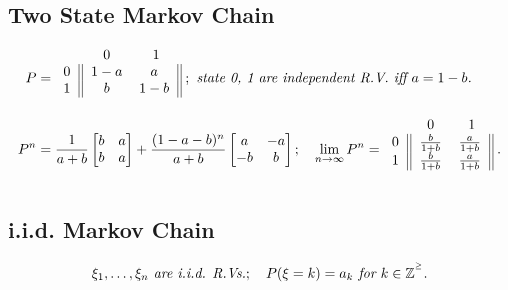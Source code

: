\documentclass{article}
\begin{document}
\subsection{Two State Markov Chain}
\begin{align*}
    P & = 
        \begin{blockarray}{ccc}
            & 0 & 1 \\
            \begin{block}{c||cc||}
                0 & 1-a & a \\
                1 & b & 1-b \\
            \end{block}
        \end{blockarray}\; ; \emph{ state 0, 1 are independent R.V. iff $a=1-b$.}\\
        P^n & = \frac{1}{a+b}
        \begin{bmatrix}
            b & a \\
            b & a \\
        \end{bmatrix} + 
        \frac{(1-a-b)^n}{a+b}
        \begin{bmatrix}
            a & -a \\
            -b & b \\
        \end{bmatrix} ; \quad
        \lim_{n\rightarrow\infty}P^n = 
            \begin{blockarray}{ccc}
                & 0 & 1 \\
                \begin{block}{c||cc||}
                    0 & \frac{b}{1+b} & \frac{a}{1+b} \\
                    1 & \frac{b}{1+b} & \frac{a}{1+b} \\
                \end{block}
            \end{blockarray}\; .
\end{align*} 

\subsection{i.i.d. Markov Chain}
\begin{align*}
    \xi_1, \dots, \xi_n \emph{ are i.i.d. R.Vs.}; \quad P(\xi = k) = a_k \emph{ for } k\in\mathbb{Z^{^\ge}}.
\end{align*}
\end{document}
